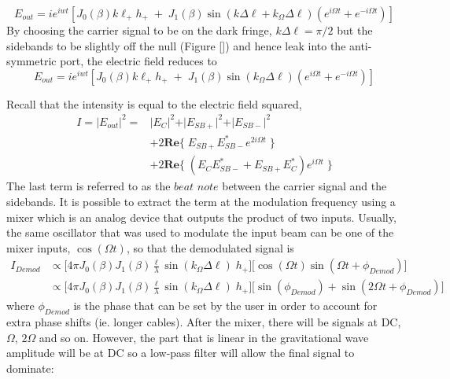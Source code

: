 		\begin{equation}
		E_{out} = i e^{iwt} [ J_0(\beta) 	k \ell_{+}  h_{+}  \; + \; J_1(\beta) \sin( k \Delta \ell + k_{\Omega} \Delta \ell) (e^{i\Omega t}  + e^{-i\Omega t}) ]
		\end{equation}
		By choosing the carrier signal to be on the dark fringe, $k \Delta \ell = \pi/2$ but the sidebands to be slightly off the null (Figure []) and hence leak into the anti-symmetric port, the electric field reduces to
		\begin{equation}
		E_{out} = i e^{iwt} [ J_0(\beta) 	k \ell_{+}  h_{+}  \; + \; J_1(\beta) \sin(k_{\Omega} \Delta \ell) ( e^{i\Omega t} + e^{-i\Omega t}) ]
		\end{equation}
		
		Recall that the intensity is equal to the electric field squared,
		\begin{equation}\label{RFdet}
		\begin{aligned}
			I	= \vert E_{out} \vert^2  =	&\vert E_{C}\vert^2 + \vert E_{SB+}\vert^2 + \vert E_{SB-}\vert^2 \\
										  	& + 2 \mathbf{Re} \{ \; E_{SB+} E^*_{SB-} e^{2i\Omega t} \; \}\\
										  	& + 2 \mathbf{Re} \{ \; (E_{C} E^*_{SB-} +  E_{SB+} E^*_{C} ) e^{i\Omega t} \; \}
		\end{aligned}
		\end{equation}
		The last term is referred to as the $beat$ $note$ between the carrier signal and the sidebands.  It is possible to extract the term at the modulation frequency using a mixer which is an analog device that outputs the product of two inputs. Usually, the same oscillator that was used to modulate the input beam can be one of the mixer inputs, $\cos(\Omega t)$,  so that the demodulated signal is
		\begin{equation}
		\begin{aligned}
		I_{Demod} 	&\propto \big[ 4 \pi  J_0(\beta) J_1(\beta) \frac{\ell}{\lambda}  \sin(k_{\Omega} \Delta \ell)  \; h_{+}\big] \big[ \cos(\Omega t)  \sin(\Omega t + \phi_{Demod}) \big] \\
					&\propto \big[ 4 \pi  J_0(\beta) J_1(\beta) \frac{\ell}{\lambda}  \sin(k_{\Omega} \Delta \ell)  \; h_{+}\big] \big[ \sin(\phi_{Demod}) + \sin(2\Omega t + \phi_{Demod}) \big]
		\end{aligned}
		\end{equation}
		where $\phi_{Demod}$ is the phase that can be set by the user in order to account for extra phase shifts (ie. longer cables). After the mixer, there will be signals at DC, $\Omega$, $2\Omega$ and so on. However, the part that is linear in the gravitational wave amplitude will be at DC so a low-pass filter will allow the final signal to dominate:
